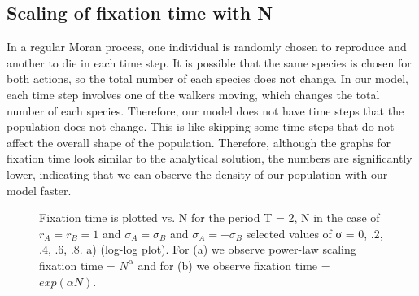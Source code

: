 \documentclass{article}
\begin{document}
\subsection{Scaling of fixation time with N}
In a regular Moran process, one individual is randomly chosen to reproduce and another to die in each time step. It is possible that the same species is chosen for both actions, so the total number of each species does not change. In our model, each time step involves one of the walkers moving, which changes the total number of each species. Therefore, our model does not have time steps that the population does not change. This is like skipping some time steps that do not affect the overall shape of the population. Therefore, although the graphs for fixation time look similar to the analytical solution, the numbers are significantly lower, indicating that we can observe the density of our population with our model faster.\\
\begin{figure}[H]
    \centering
    \qquad
    \newline
    \caption{Fixation time is plotted vs. N for the period T = 2, N in the case of $r_A = r_B = 1 $ and $\sigma_A = \sigma_B$ and $\sigma_A = - \sigma_B$ selected values of σ = 0, .2, .4, .6, .8. a) (log-log plot). For (a) we observe power-law scaling fixation time = $N^\alpha$ and for (b) we observe fixation time = $exp(\alpha N)$.}
\end{figure}
\end{document}
